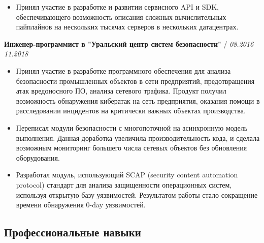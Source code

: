 \documentclass[a4paper,10pt]{article}
\newcommand{\notice}[1]{{\textcolor{dark}{\textbf{#1}}}}
\begin{document}
\begin{adjustwidth}{10pt}{10pt}
\begin{itemize}
        \item Принял участие в разработке и развитии сервисного API и SDK, обеспечивающего возможность описания сложных вычислительных пайплайнов на нескольких тысячах серверов в нескольких датацентрах.

        \end{itemize}


        \notice{Инженер-программист в "Уральский центр систем безопасности"} / \textit{08.2016 – 11.2018}

        \begin{itemize}

        \item Принял участие в разработке программного обеспечения для анализа безопасности промышленных объектов в сети предприятий, предотвращения атак вредоносного ПО, анализа сетевого трафика. Продукт получил возможность обнаружения кибератак на сеть предприятия, оказания помощи в расследовании инцидентов на критически важных объектах производства.

        \item Переписал модули безопасности с многопоточной на асинхронную модель выполнения. Данная доработка увеличила производительность кода, и сделала возможным мониторинг большего числа сетевых объектов без обновления оборудования.

        \item Разработал модуль, использующий SCAP (security content automation protocol) стандарт для анализа защищенности операционных систем, используя открытую базу уязвимостей. Результатом работы стало сокращение времени обнаружения 0-day уязвимостей.

        \end{itemize}

    \end{adjustwidth}

\subsection*{Профессиональные навыки}
\end{document}
